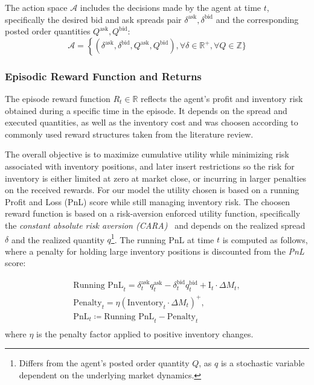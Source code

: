 The action space $\mathcal{A}$ includes the decisions made by the agent at time $t$, specifically the desired bid and ask spreads pair
$\delta^{\text{ask}}, \delta^{\text{bid}}$ and the corresponding posted order quantities $Q^{\text{ask}}, Q^{\text{bid}}$:
$$
\mathcal{A} = \left\{ (\delta^{\text{ask}}, \delta^{\text{bid}}, Q^{\text{ask}}, Q^{\text{bid}}), \forall \delta \in \mathbb{R}^+, \forall Q \in \mathbb{Z}\} \right.
$$

\subsubsection{Episodic Reward Function and Returns}

The episode reward function $R_t \in \mathbb{R}$ reflects the agent's profit and inventory risk obtained during a specific time in the episode.
It depends on the spread and executed quantities, as well as the inventory cost and was choosen according to commonly used reward structures taken from the literature review.

The overall objective is to maximize cumulative utility while minimizing risk associated with inventory positions,
and later insert restrictions so the risk for inventory is either limited at zero at market close, or incurring in larger penalties on the received rewards.
For our model the utility chosen is based on a running Profit and Loss (PnL) score while still managing inventory risk.
The choosen reward function is based on a risk-aversion enforced utility function, specifically the \textit{constant absolute risk aversion (CARA)}~\cite{Arrow1965, Pratt1964}
and depends on the realized spread $\delta$ and the realized quantity $q$\footnote{Differs from the agent's posted order quantity $Q$, as $q$ is a stochastic variable dependent on the underlying market dynamics.}.
The running PnL at time $t$ is computed as follows, where a penalty for holding large inventory positions is discounted from the \textit{PnL} score:

\begin{gather*}
    \text{Running PnL}_t = \delta_t^{\text{ask}} q_t^{\text{ask}} - \delta_t^{\text{bid}} q_t^{\text{bid}} + \text{I}_t \cdot \Delta M_t, \\
    \text{Penalty}_t = \eta \left( \text{Inventory}_t \cdot \Delta M_t \right)^+,\\
    \text{PnL}_t \coloneqq \text{Running PnL}_t - \text{Penalty}_t\\
\end{gather*}
where \( \eta \) is the penalty factor applied to positive inventory changes.

